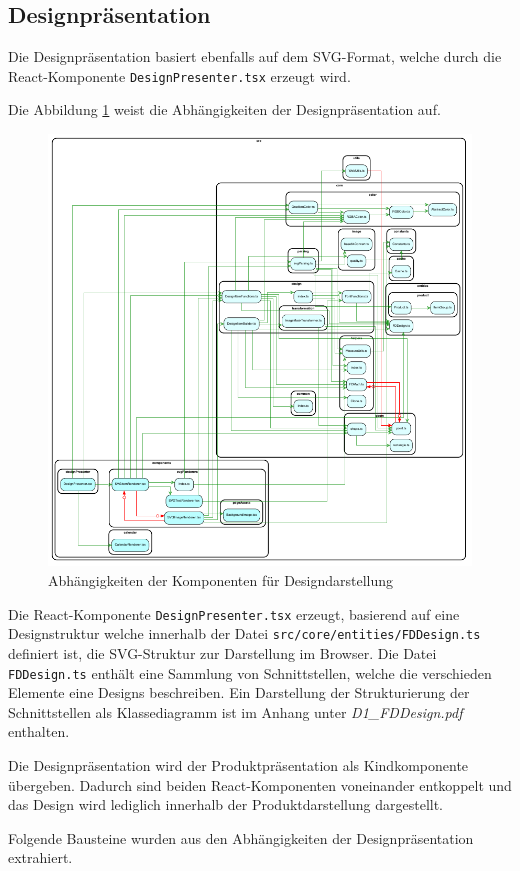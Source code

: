 
\subsection{Designpräsentation}
Die Designpräsentation basiert ebenfalls auf dem SVG-Format, welche durch die React-Komponente \lstinline|DesignPresenter.tsx| erzeugt wird. 

Die Abbildung \ref{fig:Designdarstellung} weist die Abhängigkeiten der Designpräsentation auf.

\begin{figure}[H]
    \centering
    \includegraphics[width=1\textwidth]{diagrams/Ist-Architektur/design-presenter-analysis.pdf}
    \caption{Abhängigkeiten der Komponenten für Designdarstellung}
    \label{fig:Designdarstellung}
\end{figure}

Die React-Komponente \lstinline|DesignPresenter.tsx| erzeugt, basierend auf eine Designstruktur welche innerhalb der Datei \lstinline|src/core/entities/FDDesign.ts| definiert ist, die SVG-Struktur zur Darstellung im Browser. Die Datei \lstinline|FDDesign.ts| enthält eine Sammlung von Schnittstellen, welche die verschieden Elemente eine Designs beschreiben.   
Ein Darstellung der Strukturierung der Schnittstellen als Klassediagramm ist im Anhang unter \emph{D1\_FDDesign.pdf} enthalten.

Die Designpräsentation wird der Produktpräsentation als Kindkomponente übergeben. Dadurch sind beiden React-Komponenten voneinander entkoppelt und das Design wird lediglich innerhalb der Produktdarstellung dargestellt.

Folgende Bausteine wurden aus den Abhängigkeiten der Designpräsentation extrahiert.
\begin{multicols}{2}

\end{multicols}